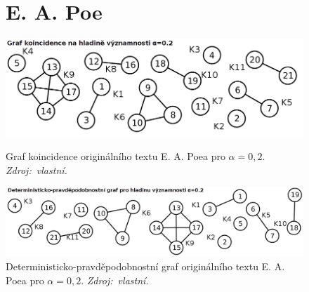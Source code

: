 \documentclass[dp.tex]{subfiles}
\begin{document}
\begin{figure}[h]
\section*{E. A. Poe}
	\centering
	\includegraphics[max width=\textwidth,keepaspectratio=true]{imgs-99-priloha-d/aa_k_20}
	\caption[Graf koincidence originálního textu E. A. Poea pro $\alpha = 0{,}2$]
            {Graf koincidence originálního textu E. A. Poea pro $\alpha = 0{,}2$. \textit{Zdroj:~vlastní.}}
	\label{fig:aa_k_20}

	\vspace*{1.5cm}

	\includegraphics[max width=\textwidth,keepaspectratio=true]{imgs-99-priloha-d/aa_d_21}
	\caption[Deterministicko-pravděpodobnostní graf originálního textu E. A. Poea pro $\alpha = 0{,}2$]      
            {Deterministicko-pravděpodobnostní graf originálního textu E. A. Poea pro $\alpha = 0{,}2$. \textit{Zdroj:~vlastní.}}
	\label{fig:aa_d_20}
\end{figure}
\end{document}
